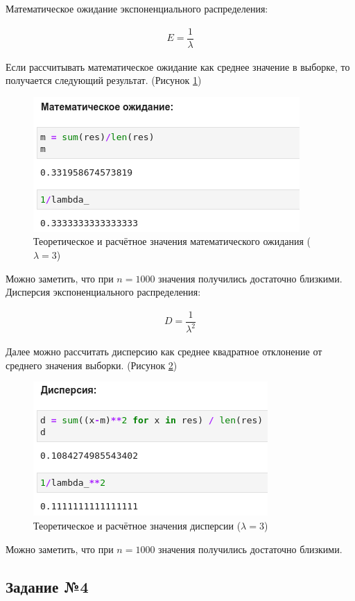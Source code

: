 \documentclass[14pt,fleqn]{extarticle}
\begin{document}
	Математическое ожидание экспоненциального распределения:
	\begin{ceqn}
		\begin{align*}
			E = \dfrac{1}{\lambda}
		\end{align*}
	\end{ceqn}
	\newpage
	Если рассчитывать математическое ожидание как среднее значение в выборке, то получается следующий результат. (Рисунок \ref{fig:exp_inverse_function_method_math})
	\begin{figure}[h]
		\centering \includegraphics[scale=0.8]{result31}
		\caption{Теоретическое и расчётное значения математического ожидания ($\lambda = 3$)}
		\label{fig:exp_inverse_function_method_math}
	\end{figure}

	Можно заметить, что при $n = 1000$ значения получились достаточно близкими.\\
	Дисперсия экспоненциального распределения:
	\begin{ceqn}
		\begin{align*}
			D = \dfrac{1}{\lambda^2}
		\end{align*}
	\end{ceqn}
	Далее можно рассчитать дисперсию как среднее квадратное отклонение от среднего значения выборки. (Рисунок \ref{fig:exp_inverse_function_method_var})
	\begin{figure}[h]
		\centering \includegraphics[scale=0.8]{result32}
		\caption{Теоретическое и расчётное значения дисперсии ($\lambda = 3$)}
		\label{fig:exp_inverse_function_method_var}
	\end{figure}

	Можно заметить, что при $n = 1000$ значения получились достаточно близкими.
	\newpage
	\subsection*{Задание №4}
\end{document}
